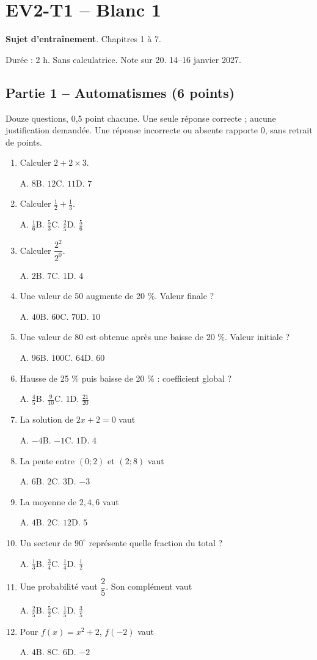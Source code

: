\clearpage\section*{EV2-T1 -- Blanc 1}\label{EV2-T1}
\textbf{Sujet d’entraînement}. Chapitres 1 à 7.\par Durée : 2 h. Sans calculatrice. Note sur 20. 14–16 janvier 2027.
\subsection*{Partie 1 -- Automatismes (6 points)}
Douze questions, 0,5 point chacune. Une seule réponse correcte ; aucune justification demandée. Une réponse incorrecte ou absente rapporte 0, sans retrait de points.
\begin{enumerate}
\item Calculer $2+2\times3$.\par A. $8$\quad B. $12$\quad C. $11$\quad D. $7$
\item Calculer $\frac12+\frac13$.\par A. $\frac{1}{6}$\quad B. $\frac{5}{3}$\quad C. $\frac{2}{5}$\quad D. $\frac{5}{6}$
\item Calculer $\dfrac{2^2}{2^{0}}$.\par A. $2$\quad B. $7$\quad C. $1$\quad D. $4$
\item Une valeur de 50 augmente de 20 \%. Valeur finale ?\par A. $40$\quad B. $60$\quad C. $70$\quad D. $10$
\item Une valeur de 80 est obtenue après une baisse de 20 \%. Valeur initiale ?\par A. $96$\quad B. $100$\quad C. $64$\quad D. $60$
\item Hausse de 25 \% puis baisse de 20 \% : coefficient global ?\par A. $\frac{4}{5}$\quad B. $\frac{9}{10}$\quad C. $1$\quad D. $\frac{21}{20}$
\item La solution de $2x+2=0$ vaut\par A. $-4$\quad B. $-1$\quad C. $1$\quad D. $4$
\item La pente entre $(0;2)$ et $(2;8)$ vaut\par A. $6$\quad B. $2$\quad C. $3$\quad D. $-3$
\item La moyenne de $2, 4, 6$ vaut\par A. $4$\quad B. $2$\quad C. $12$\quad D. $5$
\item Un secteur de $90^\circ$ représente quelle fraction du total ?\par A. $\frac{1}{3}$\quad B. $\frac{3}{4}$\quad C. $\frac{1}{4}$\quad D. $\frac{1}{2}$
\item Une probabilité vaut $\dfrac{2}{5}$. Son complément vaut\par A. $\frac{2}{5}$\quad B. $\frac{5}{2}$\quad C. $\frac{1}{5}$\quad D. $\frac{3}{5}$
\item Pour $f(x)=x^2+2$, $f(-2)$ vaut\par A. $4$\quad B. $8$\quad C. $6$\quad D. $-2$
\end{enumerate}
